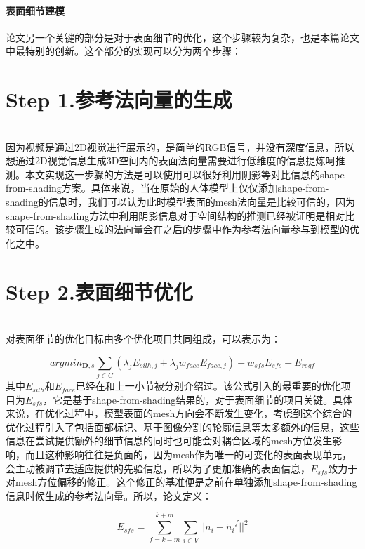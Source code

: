 \documentclass{article}
\begin{document}
\subsubsection{表面细节建模}
论文另一个关键的部分是对于表面细节的优化，这个步骤较为复杂，也是本篇论文中最特别的创新。这个部分的实现可以分为两个步骤：\\

\chapter{Step 1.参考法向量的生成}\\
因为视频是通过2D视觉进行展示的，是简单的RGB信号，并没有深度信息，所以想通过2D视觉信息生成3D空间内的表面法向量需要进行低维度的信息提炼呵推测。本文实现这一步骤的方法是可以使用可以很好利用阴影等对比信息的shape-from-shading\cite{shapefromshading}方案。具体来说，当在原始的人体模型上仅仅添加shape-from-shading的信息时，我们可以认为此时模型表面的mesh法向量是比较可信的，因为shape-from-shading方法中利用阴影信息对于空间结构的推测已经被证明是相对比较可信的。该步骤生成的法向量会在之后的步骤中作为参考法向量参与到模型的优化之中。

\chapter{Step 2.表面细节优化}\\
对表面细节的优化目标由多个优化项目共同组成，可以表示为：

\begin{equation}
	argmin_{\mathbf{D},s} \sum_{j\in C} (\lambda _jE_{silh,j} + \lambda _j w_{face}E_{face,j}) + w_{sfs}E_{sfs} + E_{regf}
\end{equation}
其中$E_{silh}$和$E_{face}$已经在\cite{paper1}和上一小节被分别介绍过。该公式引入的最重要的优化项目为$E_{sfs}$，它是基于shape-from-shading结果的，对于表面细节的项目关键。具体来说，在优化过程中，模型表面的mesh方向会不断发生变化，考虑到这个综合的优化过程引入了包括面部标记、基于图像分割的轮廓信息等太多额外的信息，这些信息在尝试提供额外的细节信息的同时也可能会对耦合区域的mesh方位发生影响，而且这种影响往往是负面的，因为mesh作为唯一的可变化的表面表现单元，会主动被调节去适应提供的先验信息，所以为了更加准确的表面信息，$E_{sfs}$致力于对mesh方位偏移的修正。这个修正的基准便是之前在单独添加shape-from-shading信息时候生成的参考法向量。所以，论文定义：

\begin{equation}
	E_{sfs} = \sum^{k+m}_{f=k-m}\sum_{i \in V} || n_i - \tilde{n_i}^{f} || ^2
\end{equation}
\end{document}
